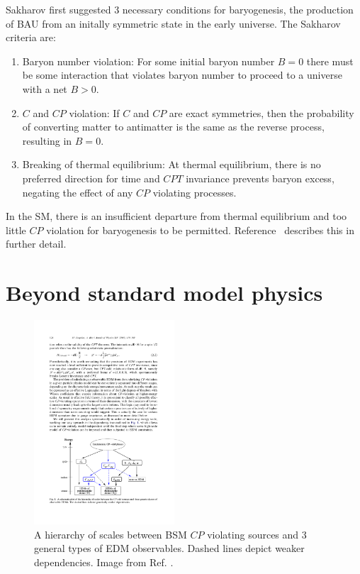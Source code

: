 Sakharov \cite{Sakharov_1991} first suggested 3  necessary conditions for baryogenesis, the production of BAU from an initally symmetric state in the early universe. The Sakharov criteria are:
%
\begin{enumerate}
    \item Baryon number violation: For some initial baryon number $B=0$ there must be some interaction that violates baryon number to proceed to a universe with a net $B>0$.
    \item $C$ and $CP$ violation: If $C$ and $CP$ are exact symmetries, then the probability of converting matter to antimatter is the same as the reverse process, resulting in $B=0$.
    \item Breaking of thermal equilibrium:  At thermal equilibrium, there is no preferred direction for time and $CPT$ invariance prevents baryon excess, negating the effect of any $CP$ violating processes.
\end{enumerate}

In the SM, there is an insufficient departure from thermal equilibrium and too little $CP$ violation for baryogenesis to be permitted. Reference~\cite{Dubbers2011} describes this in further detail.


\section{Beyond standard model physics}


\begin{figure}
    \centering
    \includegraphics[height=3in]{figures/Pospelov_BSM_CPV.pdf}
    \caption[A hierarchy of scales between BSM $CP$ violating sources and 3 general types of EDM observables.]
    {A hierarchy of scales between BSM $CP$ violating sources and 3 general types of EDM observables. Dashed lines depict weaker dependencies. Image from Ref. \cite{POS05}.}
    \label{fig:bsm_cp_violation}
\end{figure}

